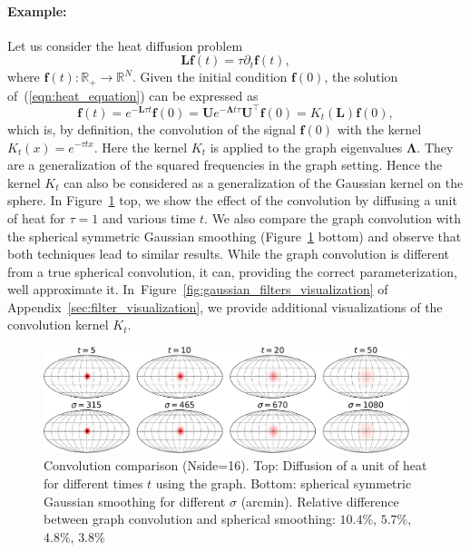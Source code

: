 \documentclass[final,twocolumn,3p,times,authoryear]{elsarticle}
\newcommand{\figref}[1]{Figure~\ref{fig:#1}}
\newcommand{\eqnref}[1]{(\ref{eqn:#1})}
\renewcommand{\b}[1]{{\bm{#1}}}   %
\newcommand{\1}{\b{1}}              %
\newcommand{\0}{\b{0}}              %
\newcommand{\g}[1]{\b{#1}}
\renewcommand{\L}{\b{L}}
\newcommand{\U}{\b{U}}
\newcommand{\trans}{^\intercal}
\newcommand{\bLambda}{\b{\Lambda}}
\begin{document}
\paragraph{Example:}
Let us consider the heat diffusion problem
\begin{equation} \label{eqn:heat_equation}
\L \b{f}(t) = \tau \partial_t \b{f}(t),
\end{equation}
where $\b{f}(t): \mathbb{R}_+ \rightarrow \mathbb{R}^N$. Given the initial condition
$\b{f}(0)$, the solution of~\eqnref{heat_equation} can be expressed as
\begin{equation}
\b{f}(t) = e^{-\L \tau t} \b{f}(0) = \U e^{-\bLambda t \tau} \U\trans \g{f}(0) = K_t(\L) \b{f}(0),
\end{equation}
which is, by definition, the convolution of the signal $\b{f}(0)$ with the kernel $K_t(x)=e^{-\tau
t x}$. Here the kernel $K_t$ is applied to the graph eigenvalues $\bLambda$. They are a generalization of the squared frequencies in the graph setting. Hence the kernel $K_t$ can also be considered as a generalization of the
Gaussian kernel on the sphere. In \figref{gaussian_filters_comparizon} top, we show
the effect of the convolution by diffusing a unit of heat for $\tau=1$ and various
time $t$. We also compare the graph convolution with the
spherical symmetric Gaussian smoothing
(\figref{gaussian_filters_comparizon} bottom) and observe that both
techniques lead to similar results. While the graph convolution is different
from a true spherical convolution, it can, providing the correct
parameterization, well approximate it.
In~\figref{gaussian_filters_visualization} of Appendix~\ref{sec:filter_visualization}, we provide additional visualizations of the
convolution kernel $K_t$.

\begin{figure}[!ht]
\centering
\includegraphics[width=0.95\textwidth]{figures/gaussian_filters_sphere.pdf}
\caption{Convolution comparison (Nside=16).
Top: Diffusion of a unit of heat for different times $t$ using the graph.
Bottom: spherical symmetric Gaussian smoothing for different $\sigma$ (arcmin).
Relative difference between graph convolution and spherical smoothing: $10.4$\%, $5.7$\%, $4.8$\%, $3.8$\% }
\label{fig:gaussian_filters_comparizon}
\end{figure}
\end{document}
